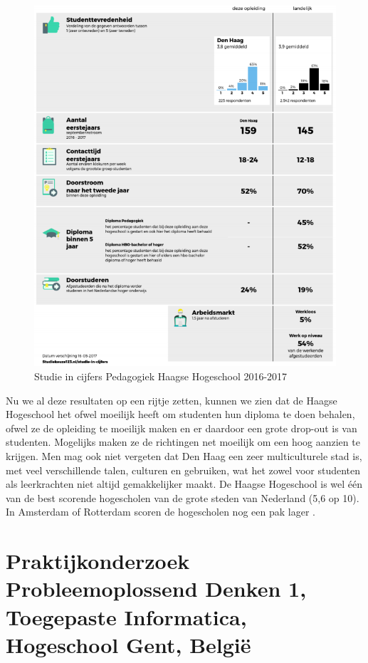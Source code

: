 \begin{figure}
	\includegraphics[width=\textwidth]
	{img/pedagogiek.png}
	\caption{Studie in cijfers Pedagogiek Haagse Hogeschool 2016-2017 \autocite{Studiekeuze2017}}
	\label{fig:pedagogiek}
\end{figure}

Nu we al deze resultaten op een rijtje zetten, kunnen we zien dat de Haagse Hogeschool het ofwel moeilijk heeft om studenten hun diploma te doen behalen, ofwel ze de opleiding te moeilijk maken en er daardoor een grote drop-out is van studenten. Mogelijks maken ze de richtingen net moeilijk om een hoog aanzien te krijgen. Men mag ook niet vergeten dat Den Haag een zeer multiculturele stad is, met veel verschillende talen, culturen en gebruiken, wat het zowel voor studenten als leerkrachten niet altijd gemakkelijker maakt. De Haagse Hogeschool is wel één van de best scorende hogescholen van de grote steden van Nederland (5,6 op 10). In Amsterdam of Rotterdam scoren de hogescholen nog een pak lager \autocite{AD-PeterKoop2017}.

\newpage
\section{Praktijkonderzoek Probleemoplossend Denken 1, Toegepaste Informatica, Hogeschool Gent, België}
\label{sec:pod1gent}

